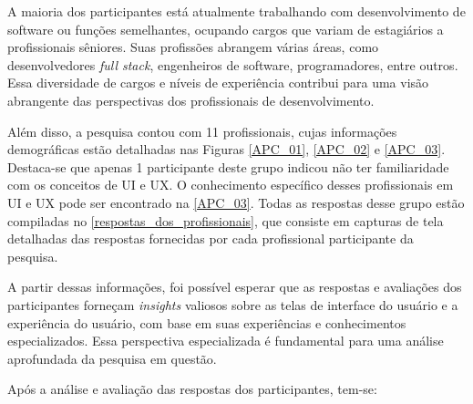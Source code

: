 A maioria dos participantes está atualmente trabalhando com desenvolvimento de software ou funções semelhantes, ocupando cargos que variam de estagiários a profissionais sêniores. Suas profissões abrangem várias áreas, como desenvolvedores \textit{full stack}, engenheiros de software, programadores, entre outros. Essa diversidade de cargos e níveis de experiência contribui para uma visão abrangente das perspectivas dos profissionais de desenvolvimento.

Além disso, a pesquisa contou com 11 profissionais, cujas informações demográficas estão detalhadas nas Figuras \ref{APC_01}, \ref{APC_02} e \ref{APC_03}. Destaca-se que apenas 1 participante deste grupo indicou não ter familiaridade com os conceitos de \ac{UI} e \ac{UX}. O conhecimento específico desses profissionais em \ac{UI} e \ac{UX} pode ser encontrado na \autoref{APC_03}. Todas as respostas desse grupo estão compiladas no \autoref{respostas_dos_profissionais}, que consiste em capturas de tela detalhadas das respostas fornecidas por cada profissional participante da pesquisa.

A partir dessas informações, foi possível esperar que as respostas e avaliações dos participantes forneçam \textit{insights} valiosos sobre as telas de interface do usuário e a experiência do usuário, com base em suas experiências e conhecimentos especializados. Essa perspectiva especializada é fundamental para uma análise aprofundada da pesquisa em questão. 

\vspace{10pt}
Após a análise e avaliação das respostas dos participantes, tem-se: 

